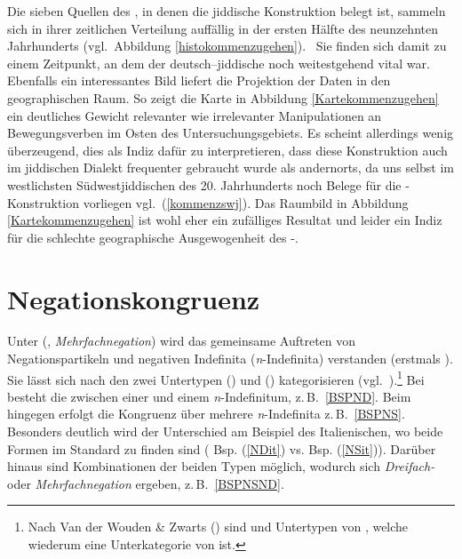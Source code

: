 Die sieben Quellen des , in denen die jiddische Konstruktion belegt ist, sammeln sich in ihrer zeitlichen Verteilung auffällig in der ersten Hälfte des neunzehnten Jahrhunderts (vgl.\, Abbildung \ref{histokommenzugehen}). \,%
 Sie finden sich damit zu einem Zeitpunkt, an dem der deutsch–jiddische  noch weitestgehend vital war. Ebenfalls ein interessantes Bild liefert die Projektion der Daten in den geographischen Raum. So zeigt die Karte in Abbildung \ref{Kartekommenzugehen} ein deutliches Gewicht relevanter wie irrelevanter Manipulationen an Bewegungsverben im Osten des Untersuchungsgebiets. Es scheint allerdings wenig überzeugend, dies als Indiz dafür zu interpretieren, dass diese Konstruktion auch im jiddischen Dialekt frequenter gebraucht wurde als andernorts, da uns selbst im westlichsten Südwestjiddischen des 20. Jahrhunderts noch Belege für die -Konstruktion vorliegen vgl.\, (\ref{kommenzswj}). Das Raumbild in Abbildung \ref{Kartekommenzugehen} ist wohl eher ein zufälliges Resultat und leider ein Indiz für die schlechte geographische Ausgewogenheit des -.  


\section{Negationskongruenz}\label{negation} 
Unter  (, \textit{Mehrfachnegation}) wird das gemeinsame Auftreten von Negationspartikeln und negativen Indefinita (\textit{n}-In\-de\-fi\-ni\-ta) verstanden (erstmals \citealt[352]{Jespersen1922}). Sie lässt sich nach den zwei Untertypen   () und  () kategorisieren (vgl.\, \citealt{Besten1986}).\footnote{Nach Van der Wouden \& Zwarts (\citeyear[318]{Wouden1992}) sind  und  Untertypen von , welche wiederum eine Unterkategorie von  ist.} Bei  besteht die  zwischen einer  und einem \textit{n}-Indefinitum, z.\,B.\, \ref{BSPND}. Beim  hingegen erfolgt die Kongruenz über mehrere \textit{n}-Indefinita z.\,B.\, \ref{BSPNS}. Besonders deutlich wird der Unterschied am Beispiel des Italienischen, wo beide Formen im Standard zu finden sind ( Bsp. (\ref{NDit}) vs.  Bsp. (\ref{NSit})). Darüber hinaus sind Kombinationen der beiden Typen möglich, wodurch sich \textit{Dreifach-} oder \textit{Mehrfachnegation} ergeben, z.\,B.\, \ref{BSPNSND}.

